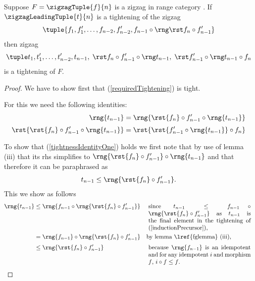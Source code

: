 {  %

\begin{lemma}
Suppose  $F=\zigzagTuple{f}{n}$ is a zigzag in range category \catcw.
If  $\zigzagLeadingTuple{t}{n}$ is a tightening of the zigzag
\begin{equation}
\label{inductionPrecursor}
\tuple{\tightlead}
\end{equation}
then  zigzag
\begin{equation}
\label{requiredTightening}\leftToRightTightening
\end{equation}
is a tightening of $F$. 


\end{lemma}
\begin{proof}
We have to show first that (\ref{requiredTightening}) is tight. 

For this we need the following identities:
\begin{align}
\label{tightnessIdentityOne}
\rng{t_{n-1}} &= \rng{\rst{f_n} \circ f'_{n-1} \circ \rng{t_{n-1}}}  \\[0.1cm]
\label{tightnessIdentityTwo}
\rst{\rst{f_n} \circ f'_{n-1} \circ \rng{t_{n-1}}}&=\rst{\rst{f'_{n-1} \circ \rng{t_{n-1}}} \circ f_n}
\end{align}

To show that (\ref{tightnessIdentityOne}) holds 
we first note that by use of lemma  (iii) 
that its rhs simplifies to 
$\rng{\rst{f_n} \circ f'_{n-1}} \circ \rng{t_{n-1}}$ 
and that therefore  it
can be paraphrased as
\[
t_{n-1} \leq \rng{\rst{f_n} \circ f'_{n-1}}.
\]
This we show as follows
\newcommand{\stepOneReason}{
\parbox[t]{6cm}{
since
$t_{n-1} \leq  f_{n-1} \circ 
       \rng{
                \rst{f_n} \circ f'_{n-1}
                     }
$
as $t_{n-1}$ is the final element in the tightening
of (\ref{inductionPrecursor}),
} }
\newcommand{\stepThreeReason}{
\parbox[t]{6cm}{
because $\rng{f_{n-1}}$ is an idempotent
and 
for any idempotent $i$ and morphism $f$, $i \circ f \leq f$.
} }
\begin{align*}
\rng{t_{n-1}} &\leq  \rng{
       f_{n-1} \circ 
       \rng{
                \rst{f_n} \circ f'_{n-1}
                     }
                                      }
        && \mbox{\stepOneReason}\\
         &= \rng{f_{n-1}} \circ 
                      \rng{
                           \rst{f_n} \circ f'_{n-1}
                                    }
        && \mbox{by lemma \lref{fglemma} (iii),}\\[0.1cm]  
    &\leq  \rng{\rst{f_n} \circ f'_{n-1}}
        && \mbox{\stepThreeReason}
\end{align*}


\end{proof}}
